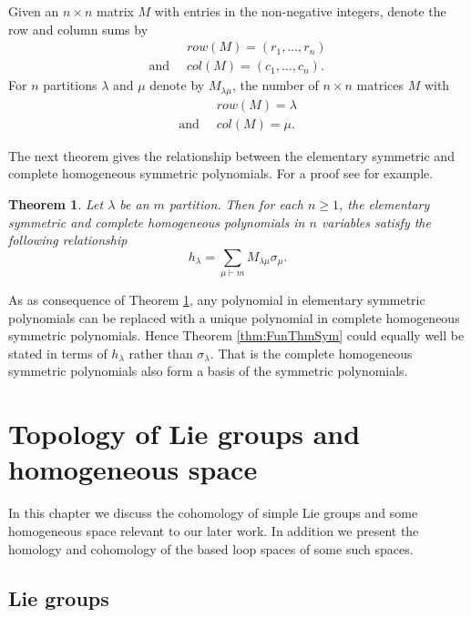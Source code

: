 \documentclass{article}
\theoremstyle{plain}
\newtheorem{thm}{Theorem}[section]
\theoremstyle{definition}
\numberwithin{thm}{section}
\begin{document}
		Given an $n\times n$ matrix $M$ with entries in the non-negative integers, denote the row and column sums by
		\begin{align*}
											&row(M)=(r_1,\dots,r_n) \\
			\text{and} \;\; &col(M)=(c_1,\dots,c_n).
		\end{align*}
		For $n$ partitions $\lambda$ and $\mu$ denote by $M_{\lambda\mu}$, the number of $n\times n$ matrices $M$ with 
		\begin{align*}
											&row(M)=\lambda \\
			\text{and} \;\; &col(M)=\mu.
		\end{align*}
		
		The next theorem gives the relationship between the elementary symmetric and complete homogeneous symmetric polynomials.
		For a proof see for example\cite[\S $7.5$]{ECstanly}.
		
		\begin{thm}\label{thm:ElmComp}
			Let $\lambda$ be an $m$ partition. Then for each $n\geq 1$, the elementary symmetric
			and complete homogeneous polynomials in $n$ variables satisfy the following relationship
			\begin{equation*}
				h_\lambda=\sum_{\mu\vdash m}{M_{\lambda\mu}\sigma_{\mu}}.
			\end{equation*}
		\end{thm}
	
		As as consequence of Theorem \ref{thm:ElmComp},
		any polynomial in elementary symmetric polynomials can be replaced with a unique polynomial in complete homogeneous symmetric polynomials.
		Hence Theorem \ref{thm:FunThmSym} could equally well be stated in terms of $h_\lambda$
		rather than $\sigma_\lambda$.
		That is the complete homogeneous symmetric polynomials
		also form a basis of the symmetric polynomials.
		
\newpage	
\section{Topology of Lie groups and homogeneous space}\label{sec:TopLie}

	In this chapter we discuss the cohomology of simple Lie groups and some homogeneous space relevant to our later work.
	In addition we present the homology and cohomology of the based loop spaces of some such spaces. 
	
	\subsection{Lie groups}\label{sec:LieGroups}
	
\end{document}
